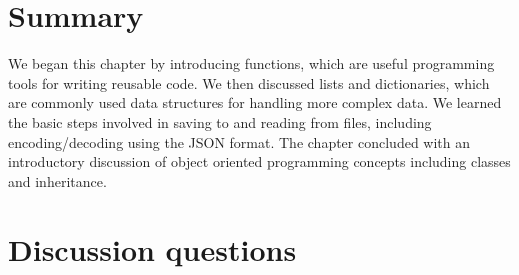 \documentclass{book}
\begin{document}
\section{Summary}

We began this chapter by introducing functions, which are useful programming tools for writing reusable code. We then discussed lists and dictionaries, which are commonly used data structures for handling more complex data. We learned the basic steps involved in saving to and reading from files, including encoding/decoding using the JSON format. The chapter concluded with an introductory discussion of object oriented programming concepts including classes and inheritance.
 
\section{Discussion questions}
\end{document}
